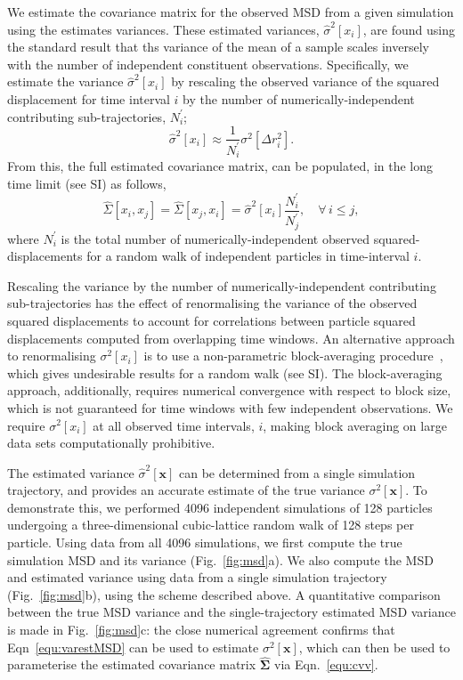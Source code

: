 \documentclass[reprint,superscriptaddress,nobibnotes,amsmath,amssymb,aps,prx,hidelinks,linenumbers]{revtex4-2}
\newcommand{\oMSD}{\ensuremath{\bm{x}}}
\newcommand{\oMSDi}{\ensuremath{x_i}}
\newcommand{\oMSDj}{\ensuremath{x_j}}
\newcommand{\nind}[1]{\ensuremath{N^\prime_{#1}}}
\newcommand{\var}[1]{\ensuremath{\sigma^2[#1]}}
\newcommand{\varest}[1]{\ensuremath{\widehat{\sigma}^2[#1]}}
\begin{document}
We estimate the covariance matrix for the observed MSD from a given simulation using the estimates variances. 
These estimated variances, $\varest{\oMSDi}$, are found using the standard result that ths variance of the mean of a sample scales inversely with the number of independent constituent observations.
Specifically, we estimate the variance $\varest{\oMSDi}$ by rescaling the observed variance of the squared displacement for time interval $i$ by the number of numerically-independent contributing sub-trajectories, $\nind{i}$;
%
\begin{equation}
    \varest{\oMSDi} \approx \frac{1}{\nind{i}}\var{\Delta r_i^2}.
    \label{equ:varestMSD}
\end{equation}
%
From this, the full estimated covariance matrix, can be populated, in the long time limit (see SI) as follows, 
%
\begin{equation}
  \widehat{\Sigma}\left[\oMSDi, \oMSDj\right]= \widehat{\Sigma}\left[\oMSDj, \oMSDi\right] =
  \varest{\oMSDi} \frac{\nind{i}}{\nind{j}},\hspace{1em} \forall\,i \leq j,
  \label{equ:cvv}
\end{equation} 
%
where $\nind{i}$ is the total number of numerically-independent observed squared-displacements for a random walk of independent particles in time-interval $i$.

Rescaling the variance by the number of numerically-independent contributing sub-trajectories has the effect of renormalising the variance of the observed squared displacements to account for correlations between particle squared displacements computed from overlapping time windows. 
An alternative approach to renormalising $\var{x_i}$ is to use a non-parametric block-averaging procedure~\cite{flyvbjerg_error_1989,frenkel_understanding_2023,materzanini_high_2021}, which gives undesirable results for a random walk (see SI). 
The block-averaging approach, additionally, requires numerical convergence with respect to block size, which is not guaranteed for time windows with few independent observations. 
We require $\var{x_i}$ at all observed time intervals, $i$, making block averaging on large data sets computationally prohibitive. 

The estimated variance $\varest{\oMSD}$ can be determined from a single simulation trajectory, and provides an accurate estimate of the true variance $\var{\oMSD}$.
To demonstrate this, we performed \num{4096} independent simulations of \num{128} particles undergoing a three-dimensional cubic-lattice random walk of \num{128} steps per particle.
Using data from all \num{4096} simulations, we first compute the true simulation MSD and its variance (Fig.~\ref{fig:msd}a).
We also compute the MSD and estimated variance using data from a single simulation trajectory (Fig.~\ref{fig:msd}b), using the scheme described above.
A quantitative comparison between the true MSD variance and the single-trajectory estimated MSD variance is made in Fig.~\ref{fig:msd}c: the close numerical agreement confirms that Eqn~\ref{equ:varestMSD} can be used to estimate $\var{\oMSD}$, which can then be used to parameterise the estimated covariance matrix $\widehat{\mathbf{\Sigma}}$ via Eqn.~\ref{equ:cvv}.
\end{document}
